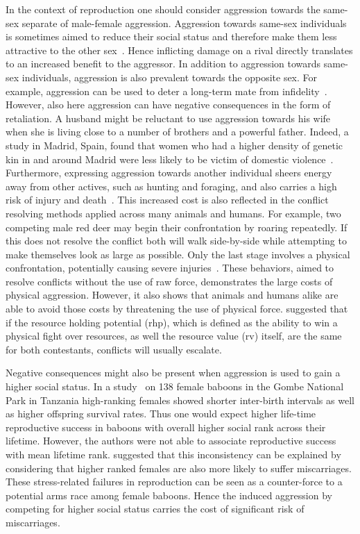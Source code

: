 In the context of reproduction one should consider aggression towards the same-sex separate of male-female aggression.
Aggression towards same-sex individuals is sometimes aimed to reduce their social status and therefore make them less attractive to the other sex~\cite{Buss1990}.
Hence inflicting damage on a rival directly translates to an increased benefit to the aggressor.
In addition to aggression towards same-sex individuals, aggression is also prevalent towards the opposite sex.
For example, aggression can be used to deter a long-term mate from infidelity~\cite{Daly1982}.
However, also here aggression can have negative consequences in the form of retaliation.
A husband might be reluctant to use aggression towards his wife when she is living close to a number of brothers and a powerful father.
Indeed, a study in Madrid, Spain, found that women who had a higher density of genetic kin in and around Madrid were less likely to be victim of domestic violence~\cite{Figueredo1995}.
Furthermore, expressing aggression towards another individual sheers energy away from other actives, such as hunting and foraging, and also carries a high risk of injury and death~\cite{Packer1995}.  
This increased cost is also reflected in the conflict resolving methods applied across many animals and humans.
For example, two competing male red deer may begin their confrontation by roaring repeatedly.
If this does not resolve the conflict both will walk side-by-side while attempting to make themselves look as large as possible.
Only the last stage involves a physical confrontation, potentially causing severe injuries~\cite{Clutton-Brock1979}.
These behaviors, aimed to resolve conflicts without the use of raw force, demonstrates the large costs of physical aggression.
However, it  also shows that animals and humans alike are able to avoid those costs by threatening the use of physical force.
\citet{Maxson2005} suggested that if the resource holding potential (\acrshort{rhp}), which is defined as the ability to win a physical fight over resources,  as well the resource value (\acrshort{rv}) itself, are the same for both contestants, conflicts will usually escalate.

Negative consequences might also be present when aggression is used to gain a higher social status.
In a study~\cite{Packer1995} on 138 female baboons in the Gombe National Park in Tanzania high-ranking females showed shorter inter-birth intervals as well as higher offspring survival rates.
Thus one would expect higher life-time reproductive success in baboons with overall higher social rank across their lifetime.
However, the authors were not able to associate reproductive success with mean lifetime rank.
\citet{Packer1995} suggested that this inconsistency can be explained by considering that higher ranked females are also more likely to suffer  miscarriages.
These stress-related failures in reproduction can be seen as a counter-force to a potential arms race among female baboons.
Hence the induced aggression by competing for higher social status carries the cost of significant risk of miscarriages.

